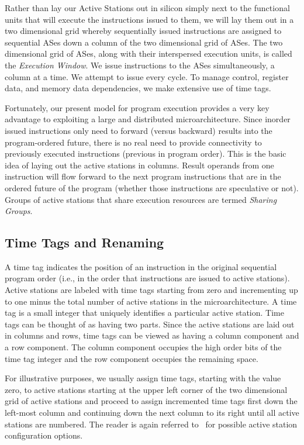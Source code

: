 \documentclass[10pt,twocolumn,dvips]{article}
\begin{document}
Rather than lay our Active Stations out in silicon simply next to
the functional units that will execute the instructions issued to them,
we will lay them out in a two dimensional grid whereby sequentially
issued instructions are assigned to sequential ASes down a column of
the two dimensional grid of ASes.  The two dimensional
grid of ASes, along with their interspersed execution units,
is called the {\em Execution Window}.
We issue instructions to the ASes simultaneously, a column at
a time.  We attempt to issue every cycle.
To manage control, register data, and memory
data dependencies, we make extensive use of time tags.

Fortunately, our present model for program execution provides
a very key advantage to exploiting a large and distributed microarchitecture.
Since inorder issued instructions 
only need to forward (versus backward) results into the
program-ordered future, there is no real need to provide connectivity
to previously executed instructions 
(previous in program order).  This is the basic
idea of laying out the active stations in columns.  Result operands
from one instruction will flow forward to the next program instructions
that are in the ordered future of the program (whether those
instructions are speculative or not).  
Groups of active stations
that share execution resources are termed \textit{Sharing Groups}.
\vspace{-0.2in}
\subsection{Time Tags and Renaming}
\vspace{-0.1in}
A time tag indicates
the position of an instruction in the original 
sequential program order (i.e., in the order that instructions are issued
to active stations).  
Active stations are labeled with time tags starting
from zero and incrementing up to one minus the total number of
active stations in the microarchitecture.  
A time tag is a small
integer that uniquely identifies a particular active station.
Time tags can be thought of as having two
parts.  Since the active stations are laid out
in columns and rows, time tags can be viewed as having a column
component and a row component.  The column component 
occupies the high order bits of
the time tag integer and the row component occupies the remaining space.

For illustrative purposes, we usually assign time tags, starting with the
value zero,
to active stations starting at the upper left corner of the two
dimensional grid of active stations and proceed to assign incremented
time tags first down the left-most column and continuing down the
next column to its right until all active stations are numbered.
The reader is again referred to~\cite{Uht01} for possible
active station configuration options. 
\end{document}
